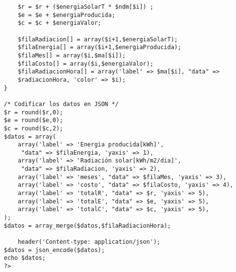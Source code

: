 \begin{verbatim}
	$r = $r + ($energiaSolarT * $ndm[$i]) ;
	$e = $e + $energiaProducida;
	$c = $c + $energiaValor;

	$filaRadiacion[] = array($i+1,$energiaSolarT);
	$filaEnergia[] = array($i+1,$energiaProducida);
	$filaMes[] = array($i,$ma[$i]);
	$filaCosto[] = array($i,$energiaValor);
	$filaRadiacionHora[] = array('label' => $ma[$i], "data" => 
	$radiacionHora, 'color' => $i); 
}

/* Codificar los datos en JSON */
$r = round($r,0);
$e = round($e,0);
$c = round($c,2);
$datos = array(
	array('label' => 'Energia producida[kWh]',
	 "data" => $filaEnergia, 'yaxis' => 1),
	array('label' => 'Radiación solar[kWh/m2/dia]',
	 "data" => $filaRadiacion, 'yaxis' => 2),
	array('label' => 'meses', "data" => $filaMes, 'yaxis' => 3),
	array('label' => 'costo', "data" => $filaCosto, 'yaxis' => 4),
	array('label' => 'totalR', "data" => $r, 'yaxis' => 5),
	array('label' => 'totalE', "data" => $e, 'yaxis' => 5),
	array('label' => 'totalC', "data" => $c, 'yaxis' => 5),
);
$datos = array_merge($datos,$filaRadiacionHora);

	header('Content-type: application/json');
$datos = json_encode($datos);
echo $datos;
?>
\end{verbatim}
